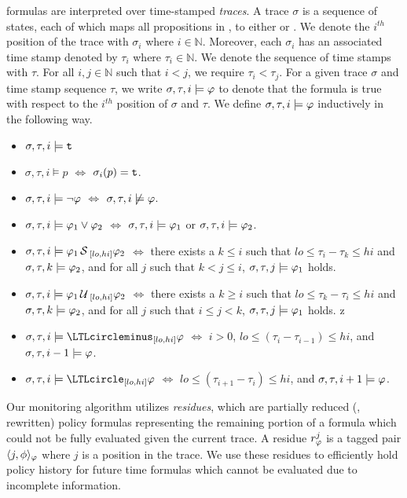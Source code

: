 \planguage formulas are interpreted over time-stamped \emph{traces}. A trace $\sigma$ is a sequence of states, each of which maps all propositions in \cP, to either \true or \false. We denote the $i^{th}$ position of the trace with $\sigma_i$ where $i\in\mathbb{N}$. Moreover, each $\sigma_i$ has an associated time stamp denoted by $\tau_i$ where $\tau_i\in\mathbb{N}$. 
We denote the sequence of time stamps with $\tau$. For all $i, j\in\mathbb{N}$ such that $i < j$, we require $\tau_i < \tau_j$. For a given trace $\sigma$ and time stamp sequence $\tau$, we write $\sigma, \tau, i\models\varphi$ to denote that the formula \policy is true with respect to the $i^{th}$ position of $\sigma$ and $\tau$. We define $\sigma, \tau, i\models\varphi$  inductively in the following way. 
\begin{itemize}
 \item $\sigma, \tau, i\models\mathrm{\texttt{t}}$
 \item $\sigma, \tau, i\models p$ $\Longleftrightarrow$ $\sigma_i(p) = \mathrm{\texttt{t}}$. 
 \item $\sigma, \tau, i\models\neg\varphi$ $\Longleftrightarrow$ $\sigma, \tau, i \not\models\varphi$. 
 \item $\sigma, \tau, i\models\varphi_1\vee\varphi_2$ $\Longleftrightarrow$ $\sigma, \tau, i\models\varphi_1$ or $\sigma, \tau, i\models\varphi_2$. 
 \item $\sigma, \tau, i\models\varphi_1\,\mathrm{\cal S}\,_{[lo, hi]}\varphi_2$ $\Longleftrightarrow$ there exists a $k\leq i$ such that $lo\leq\tau_i-\tau_k\leq hi$ and $\sigma, \tau, k\models\varphi_2$, and for all $j$ such that $k< j\leq i$, $\sigma, \tau, j\models\varphi_1$ holds. 
 \item $\sigma, \tau, i\models\varphi_1\,\mathrm{\cal U}\,_{[lo, hi]}\varphi_2$ $\Longleftrightarrow$ there exists a $k\geq i$ such that $lo\leq\tau_k-\tau_i\leq hi$ and $\sigma, \tau, k\models\varphi_2$, and for all $j$ such that $i\leq j< k$, $\sigma, \tau, j\models\varphi_1$ holds.
 z
 \item $\sigma, \tau, i\models\yesterday_{[lo, hi]}\policy$ $\Longleftrightarrow$ $i > 0$, $lo \leq (\tau_i-\tau_{i-1})\leq hi$, and $\sigma, \tau, i-1\models\varphi$.
 \item $\sigma, \tau, i\models\tomorrow_{[lo, hi]}\policy$ $\Longleftrightarrow$ $lo \leq (\tau_{i+1}-\tau_{i})\leq hi$, and $\sigma, \tau, i+1\models\varphi$. 
\end{itemize}


Our monitoring algorithm utilizes \emph{residues}, which are partially reduced (\ie, rewritten) policy formulas representing the remaining portion of a formula which could not be fully evaluated given the current trace. A residue $r^j_{\varphi}$ is a tagged pair $\langle j, \phi \rangle_{\varphi}$ where $j$ is a position in the trace. We use these residues to efficiently hold policy history for future time formulas which cannot be evaluated due to incomplete information.

